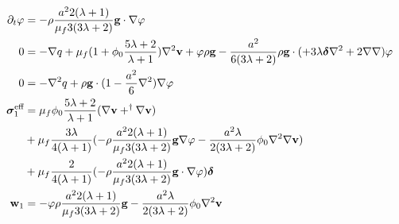 \begin{align*}
    \partial_t \varphi &= - \rho \frac{a^22(\lambda+1)}{\mu_f 3(3\lambda+2)}\textbf{g}\cdot \mathbf{\nabla} \varphi \\
    0 &= 
    - \mathbf{\nabla}  q
    + \mu_f (1+\phi_0 \frac{5\lambda +2}{\lambda+1}) \mathbf{\nabla}^2\textbf{v}
    + \varphi \rho \textbf{g}
    -  \frac{a^2}{ 6(3\lambda+2)} \rho \textbf{g}\cdot (
    + 3\lambda \bm\delta \mathbf{\nabla}^2   
    +  2 \mathbf{\nabla}\mathbf{\nabla}  
    )\varphi\\
    0 &= 
    - \mathbf{\nabla}^2 q
    + \rho \textbf{g} \cdot(1 - \frac{a^2}{6}\mathbf{\nabla}^2) \mathbf{\nabla} \varphi \\
    \bm\sigma^\text{eff}_1
    &=
     \mu_f \phi_0 \frac{5\lambda +2}{\lambda+1} (\mathbf{\nabla}\textbf{v}+^\dagger \mathbf{\nabla} \textbf{v})\\
    &+ \mu_f \frac{3\lambda}{4(\lambda+1)}  (
    - \rho \frac{a^22(\lambda+1)}{\mu_f 3(3\lambda+2)}\textbf{g} \mathbf{\nabla}\varphi  
    - \frac{a^2\lambda}{2(3\lambda+2)} \phi_0 \mathbf{\nabla}^2 \mathbf{\nabla}\textbf{v} 
    )\\
    &+ \mu_f \frac{ 2}{4(\lambda+1)} (
        -   \rho \frac{a^22(\lambda+1)}{\mu_f 3(3\lambda+2)}\textbf{g} \cdot \mathbf{\nabla}\varphi  
    ) \bm\delta\\
    \textbf{w}_1 &= 
    -  \varphi \rho \frac{a^22(\lambda+1)}{\mu_f 3(3\lambda+2)}\textbf{g} 
    - \frac{a^2\lambda}{2(3\lambda+2)} \phi_0 \mathbf{\nabla}^2 \textbf{v} 
\end{align*} 

